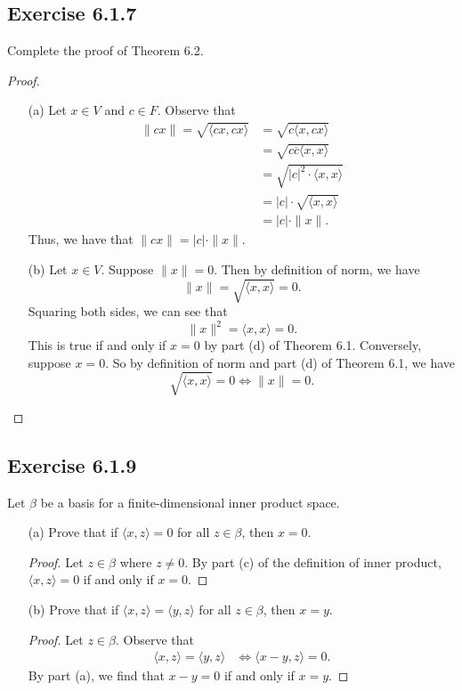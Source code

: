\subsection*{Exercise 6.1.7} Complete the proof of Theorem 6.2.
\begin{proof}
\begin{enumerate}
    \item[(a)] Let \( x \in V  \) and \( c \in F  \). Observe that
        \begin{align*}
            \| cx \| = \sqrt{ \langle  cx , cx \rangle }  
                   &= \sqrt{c \langle x , cx \rangle }  \\
                   &= \sqrt{ c \overline{c} \langle x , x \rangle } \\
                   &= \sqrt{ | c |^{2} \cdot \langle x , x \rangle } \\
                   &= | c |  \cdot \sqrt{ \langle x , x \rangle } \\
                   &= | c |  \cdot \| x \|.
        \end{align*}
        Thus, we have that \( \| cx \| = | c  |  \cdot \| x \| \).
    \item[(b)] Let \( x \in V  \). Suppose \( \| x \| = 0   \). Then by definition of norm, we have
        \[ \| x \| = \sqrt{ \langle x , x \rangle } = 0. \]
        Squaring both sides, we can see that 
        \[  \| x \|^{2} = \langle  x , x \rangle = 0. \]
        This is true if and only if \( x = 0  \) by part (d) of Theorem 6.1. Conversely, suppose \( x = 0   \). So by definition of norm and part (d) of Theorem 6.1, we have  
        \[  \sqrt{ \langle x , x \rangle }  = 0 \iff \| x \| = 0. \]
\end{enumerate}
\end{proof}

\subsection*{Exercise 6.1.9} Let \( \beta \) be a basis for a finite-dimensional inner product space.
\begin{enumerate}
    \item[(a)] Prove that if \( \langle x , z \rangle = 0  \) for all \( z \in \beta  \), then \( x = 0  \).
        \begin{proof}
            Let \( z \in \beta  \) where \( z \neq 0  \). By part (c) of the definition of inner product, \( \langle x , z \rangle = 0  \) if and only if \( x = 0  \).
        \end{proof}
    \item[(b)] Prove that if \( \langle x , z \rangle = \langle y , z \rangle \) for all \( z \in \beta  \), then \( x = y  \).
        \begin{proof}
        Let \( z \in \beta  \). Observe that
        \begin{align*}
            \langle x , z \rangle = \langle y , z \rangle &\iff \langle  x - y  , z  \rangle = 0.
        \end{align*}
        By part (a), we find that \( x - y = 0  \) if and only if \( x = y  \).
        \end{proof}
\end{enumerate}

